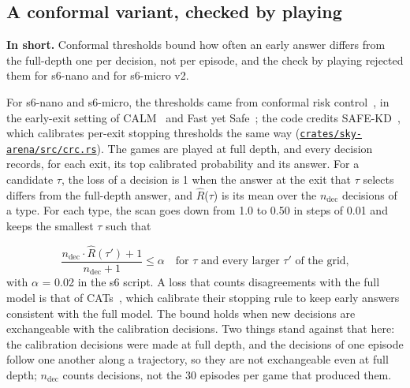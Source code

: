 \documentclass[10pt]{article}
\begin{document}
\subsection{A conformal variant, checked by playing}\label{sec:5.4}

\textbf{In short.} Conformal thresholds bound how often an early answer differs from the full-depth one per decision, not per episode, and the check by playing rejected them for s6-nano and for s6-micro v2.

For s6-nano and s6-micro, the thresholds came from conformal risk control~\cite{angelopoulos2022crc}, in the early-exit setting of CALM~\cite{schuster2022calm} and Fast yet Safe~\cite{jazbec2024fastyetsafe}; the code credits SAFE-KD~\cite{khazem2026safekd}, which calibrates per-exit stopping thresholds the same way (\href{https://github.com/maxgfr/skycmd/blob/main/crates/sky-arena/src/crc.rs}{\texttt{crates/\allowbreak{}sky-arena/\allowbreak{}src/\allowbreak{}crc.rs}}). The games are played at full depth, and every decision records, for each exit, its top calibrated probability and its answer. For a candidate $\tau$, the loss of a decision is 1 when the answer at the exit that $\tau$ selects differs from the full-depth answer, and $\hat R$($\tau$) is its mean over the $n_{\mathrm{dec}}$ decisions of a type. For each type, the scan goes down from 1.0 to 0.50 in steps of 0.01 and keeps the smallest $\tau$ such that

\begin{equation}\label{eq:7}
\frac{n_{\mathrm{dec}} \cdot \hat R(\tau') + 1}{n_{\mathrm{dec}} + 1} \leq \alpha \quad \text{for } \tau \text{ and every larger } \tau' \text{ of the grid,}
\end{equation}
with $\alpha$ = 0.02 in the s6 script. A loss that counts disagreements with the full model is that of CATs~\cite{schuster2021cats}, which calibrate their stopping rule to keep early answers consistent with the full model. The bound holds when new decisions are exchangeable with the calibration decisions. Two things stand against that here: the calibration decisions were made at full depth, and the decisions of one episode follow one another along a trajectory, so they are not exchangeable even at full depth; $n_{\mathrm{dec}}$ counts decisions, not the 30 episodes per game that produced them.
\end{document}
